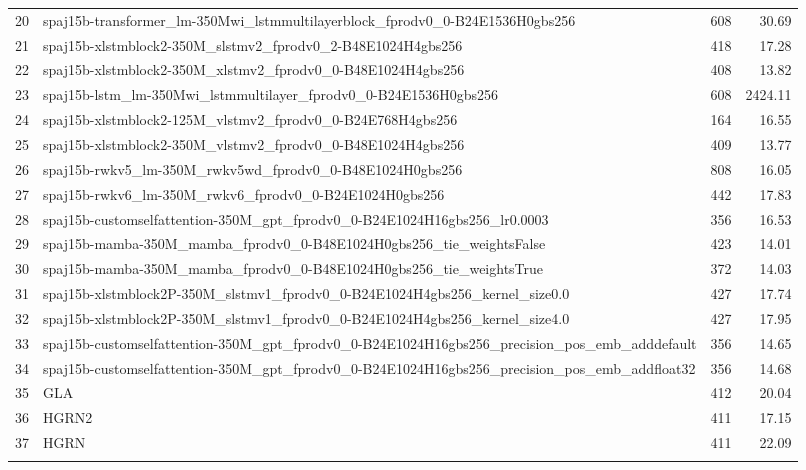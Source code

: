 \begin{tabular}{llrr}
20 & spaj15b-transformer_lm-350Mwi_lstmmultilayerblock_fprodv0_0-B24E1536H0gbs256 & 608 & 30.69 \\
21 & spaj15b-xlstmblock2-350M_slstmv2_fprodv0_2-B48E1024H4gbs256 & 418 & 17.28 \\
22 & spaj15b-xlstmblock2-350M_xlstmv2_fprodv0_0-B48E1024H4gbs256 & 408 & 13.82 \\
23 & spaj15b-lstm_lm-350Mwi_lstmmultilayer_fprodv0_0-B24E1536H0gbs256 & 608 & 2424.11 \\
24 & spaj15b-xlstmblock2-125M_vlstmv2_fprodv0_0-B24E768H4gbs256 & 164 & 16.55 \\
25 & spaj15b-xlstmblock2-350M_vlstmv2_fprodv0_0-B48E1024H4gbs256 & 409 & 13.77 \\
26 & spaj15b-rwkv5_lm-350M_rwkv5wd_fprodv0_0-B48E1024H0gbs256 & 808 & 16.05 \\
27 & spaj15b-rwkv6_lm-350M_rwkv6_fprodv0_0-B24E1024H0gbs256 & 442 & 17.83 \\
28 & spaj15b-customselfattention-350M_gpt_fprodv0_0-B24E1024H16gbs256_lr0.0003 & 356 & 16.53 \\
29 & spaj15b-mamba-350M_mamba_fprodv0_0-B48E1024H0gbs256_tie_weightsFalse & 423 & 14.01 \\
30 & spaj15b-mamba-350M_mamba_fprodv0_0-B48E1024H0gbs256_tie_weightsTrue & 372 & 14.03 \\
31 & spaj15b-xlstmblock2P-350M_slstmv1_fprodv0_0-B24E1024H4gbs256_kernel_size0.0 & 427 & 17.74 \\
32 & spaj15b-xlstmblock2P-350M_slstmv1_fprodv0_0-B24E1024H4gbs256_kernel_size4.0 & 427 & 17.95 \\
33 & spaj15b-customselfattention-350M_gpt_fprodv0_0-B24E1024H16gbs256_precision_pos_emb_adddefault & 356 & 14.65 \\
34 & spaj15b-customselfattention-350M_gpt_fprodv0_0-B24E1024H16gbs256_precision_pos_emb_addfloat32 & 356 & 14.68 \\
35 & GLA & 412& 20.04 \\
36 & HGRN2 & 411& 17.15 \\
37 & HGRN & 411 & 22.09\\
\bottomrule
\caption{xLSTM Benchmark Models Test PPL}
\end{tabular}

